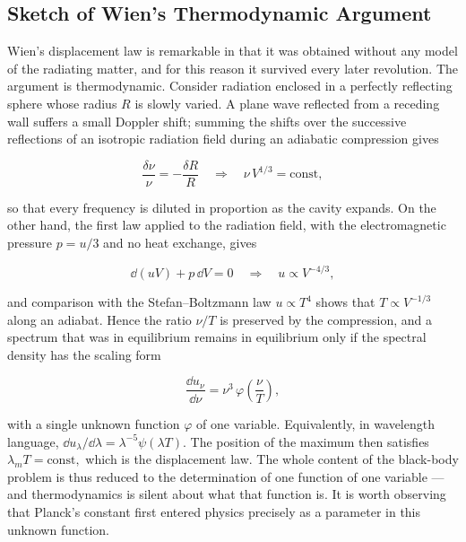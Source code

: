 \subsection*{Sketch of Wien's Thermodynamic Argument}
Wien's displacement law is remarkable in that it was obtained without any model of the radiating matter, and for this reason it survived every later revolution. The argument is thermodynamic. Consider radiation enclosed in a perfectly reflecting sphere whose radius $R$ is slowly varied. A plane wave reflected from a receding wall suffers a small Doppler shift; summing the shifts over the successive reflections of an isotropic radiation field during an adiabatic compression gives
\begin{linenomath}
\begin{equation}
    \frac{\delta \nu}{\nu}=-\frac{\delta R}{R}
    \quad\Longrightarrow\quad
    \nu\,V^{1/3}=\text{const},
\end{equation}
\end{linenomath}
so that every frequency is diluted in proportion as the cavity expands. On the other hand, the first law applied to the radiation field, with the electromagnetic pressure $p=u/3$ and no heat exchange, gives
\begin{linenomath}
\begin{equation}
    \dd(uV)+p\,\dd V=0
    \quad\Longrightarrow\quad
    u\propto V^{-4/3},
\end{equation}
\end{linenomath}
and comparison with the Stefan--Boltzmann law $u\propto T^4$ shows that $T\propto V^{-1/3}$ along an adiabat. Hence the ratio $\nu/T$ is preserved by the compression, and a spectrum that was in equilibrium remains in equilibrium only if the spectral density has the scaling form
\begin{linenomath}
\begin{equation}
    \frac{\dd u_\nu}{\dd\nu}=\nu^3\,\varphi\left(\frac{\nu}{T}\right),
\end{equation}
\end{linenomath}
with a single unknown function $\varphi$ of one variable. Equivalently, in wavelength language, $\dd u_\lambda/\dd\lambda=\lambda^{-5}\psi(\lambda T).$ The position of the maximum then satisfies $\lambda_mT=\text{const},$ which is the displacement law. The whole content of the black-body problem is thus reduced to the determination of one function of one variable --- and thermodynamics is silent about what that function is. It is worth observing that Planck's constant first entered physics precisely as a parameter in this unknown function.

